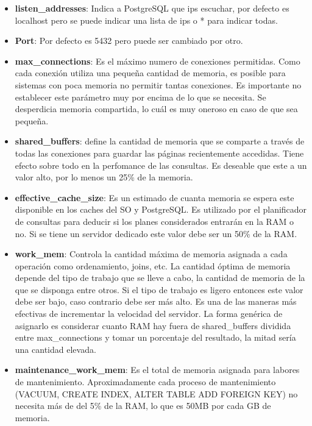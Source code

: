 \begin{itemize}
\item \textbf{listen\_addresses}: Indica a PostgreSQL que ips escuchar, por defecto es localhost pero se puede indicar una lista de ips o * para indicar todas.

\item \textbf{Port}: Por defecto es 5432 pero puede ser cambiado por otro.

\item \textbf{max\_connections}: Es el máximo numero de conexiones permitidas. Como cada conexión utiliza una pequeña cantidad de memoria, es posible para sistemas con poca memoria no permitir tantas conexiones. Es importante no establecer este parámetro muy por encima de lo que se necesita. Se desperdicia memoria compartida, lo cuál es muy oneroso en caso de que sea pequeña.

\item \textbf{shared\_buffers}: define la cantidad de memoria que se comparte a través de todas las conexiones para guardar las páginas recientemente accedidas. Tiene efecto sobre todo en la perfomance de las consultas. Es deseable que este a un valor alto, por lo menos un 25\% de la memoria.

\item \textbf{effective\_cache\_size}: Es un estimado de cuanta memoria se espera este disponible en los caches del SO y PostgreSQL. Es utilizado por el planificador de consultas para deducir si los planes considerados entrarán en la RAM o no. Si se tiene un servidor dedicado este valor debe ser un 50\% de la RAM.

\item \textbf{work\_mem}: Controla la cantidad máxima de memoria asignada a cada operación como ordenamiento, joins, etc. La cantidad óptima de memoria depende del tipo de trabajo que se lleve a cabo, la cantidad de memoria de la que se disponga entre otros. Si el tipo de trabajo es  ligero entonces este valor debe ser bajo, caso contrario debe ser más alto. Es una de las maneras más efectivas de incrementar la velocidad del servidor. La forma genérica de asignarlo es considerar cuanto RAM hay fuera de shared\_buffers dividida entre max\_connections y tomar un porcentaje del resultado, la mitad sería una cantidad elevada. 

\item \textbf{maintenance\_work\_mem}: Es el total de memoria asignada para labores de mantenimiento. Aproximadamente cada proceso de mantenimiento (VACUUM, CREATE INDEX, ALTER TABLE ADD FOREIGN KEY) no necesita más de del 5\% de la RAM, lo que es 50MB por cada GB de memoria.


\end{itemize}
